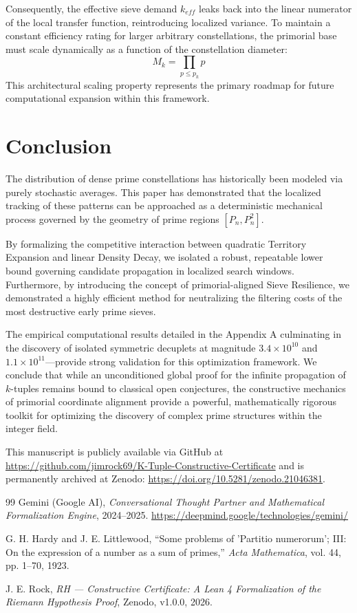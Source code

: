 \documentclass[sn-mathphys-num, pdflatex]{sn-jnl}
\begin{document}
Consequently, the effective sieve demand $k_{eff}$ leaks back into the linear numerator of the local transfer function, reintroducing localized variance. To maintain a constant efficiency rating for larger arbitrary constellations, the primorial base must scale dynamically as a function of the constellation diameter:
\begin{equation}
M_k = \prod_{p \le p_k} p
\end{equation}
This architectural scaling property represents the primary roadmap for future computational expansion within this framework.

\section{Conclusion}

The distribution of dense prime constellations has historically been modeled via purely stochastic averages. This paper has demonstrated that the localized tracking of these patterns can be approached as a deterministic mechanical process governed by the geometry of prime regions $[P_n, P_n^2]$.

By formalizing the competitive interaction between quadratic Territory Expansion and linear Density Decay, we isolated a robust, repeatable lower bound governing candidate propagation in localized search windows. Furthermore, by introducing the concept of primorial-aligned Sieve Resilience, we demonstrated a highly efficient method for neutralizing the filtering costs of the most destructive early prime sieves. 

The empirical computational results detailed in the Appendix A culminating in the discovery of isolated symmetric decuplets at magnitude $3.4 \times 10^{10}$ and $1.1 \times 10^{11}$—provide strong validation for this optimization framework. We conclude that while an unconditioned global proof for the infinite propagation of $k$-tuples remains bound to classical open conjectures, the constructive mechanics of primorial coordinate alignment provide a powerful, mathematically rigorous toolkit for optimizing the discovery of complex prime structures within the integer field.

This manuscript is publicly available via GitHub at 
\url{https://github.com/jimrock69/K-Tuple-Constructive-Certificate} 
and is permanently archived at Zenodo: 
\href{https://doi.org/10.5281/zenodo.21046381}{https://doi.org/10.5281/zenodo.21046381}.

\begin{thebibliography}{99}
 Gemini (Google AI), \textit{Conversational Thought Partner and Mathematical Formalization Engine}, 2024--2025. \url{https://deepmind.google/technologies/gemini/}

G. H. Hardy and J. E. Littlewood,
``Some problems of 'Partitio numerorum'; III: On the expression of a number as a sum of primes,''
\textit{Acta Mathematica}, vol. 44, pp. 1--70, 1923.

J. E. Rock, \textit{RH — Constructive Certificate: A Lean 4 Formalization of the Riemann Hypothesis Proof}, Zenodo, v1.0.0, 2026.
\end{thebibliography}
\end{document}
